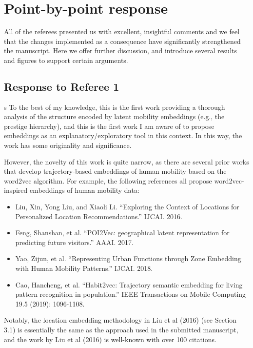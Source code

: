 \documentclass[12pt,a4paper]{article}
\newcounter{comment}[subsection]
\newcommand{\rcomment}[1]{%
\vspace{10pt}
\begin{sectionbox}
s #1
\end{sectionbox}
}
\begin{document}
%
%
\clearpage
\section{Point-by-point response}
All of the referees presented us with excellent, insightful comments and we feel that the changes implemented as a consequence have signiﬁcantly strengthened the manuscript. Here we offer further discussion, and introduce several results and figures to support certain arguments.
\subsection{Response to Referee 1}
\setcounter{section}{1}


\rcomment{%
	To the best of my knowledge, this is the first work providing a thorough analysis of the structure encoded by latent mobility embeddings (e.g., the prestige hierarchy), and this is the first work I am aware of to propose embeddings as an explanatory/exploratory tool in this context. In this way, the work has some originality and significance.

	However, the novelty of this work is quite narrow, as there are several prior works that develop trajectory-based embeddings of human mobility based on the word2vec algorithm. For example, the following references all propose word2vec-inspired embeddings of human mobility data:

	\begin{itemize}
		\item Liu, Xin, Yong Liu, and Xiaoli Li. ``Exploring the Context of Locations for Personalized Location Recommendations.'' IJCAI. 2016.
		\item Feng, Shanshan, et al. ``POI2Vec: geographical latent representation for predicting future visitors.'' AAAI. 2017.
		\item Yao, Zijun, et al. ``Representing Urban Functions through Zone Embedding with Human Mobility Patterns.'' IJCAI. 2018.
		\item Cao, Hancheng, et al. ``Habit2vec: Trajectory semantic embedding for living pattern recognition in population.'' IEEE Transactions on Mobile Computing 19.5 (2019): 1096-1108.
	\end{itemize}

	Notably, the location embedding methodology in Liu et al (2016) (see Section 3.1) is essentially the same as the approach used in the submitted manuscript, and the work by Liu et al (2016) is well-known with over 100 citations.
}
\end{document}

